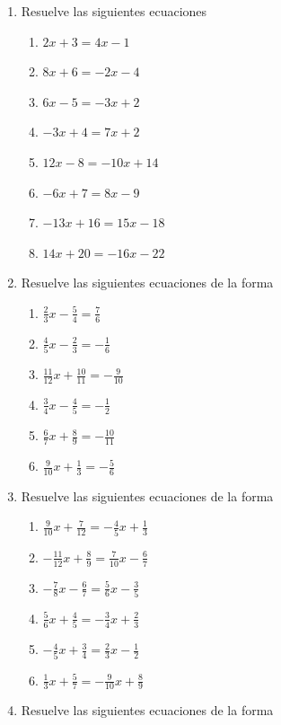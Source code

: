 \documentclass[12pt]{article}
\begin{document}
\begin{enumerate}
\def\labelenumi{\arabic{enumi}.}
\item
  Resuelve las siguientes ecuaciones

  \begin{enumerate}
  \def\labelenumii{\roman{enumii}.}
  \item
    \(2x + 3 = 4x - 1\)
  \item
    \(8x + 6 = -2x - 4\)
  \item
    \(6x - 5 = -3x + 2\)
  \item
    \(-3x + 4 = 7x + 2\)
  \item
    \(12x - 8 = -10x + 14\)
  \item
    \(-6x + 7 = 8x - 9\)
  \item
    \(-13x + 16 = 15x - 18\)
  \item
    \(14x + 20 = -16x - 22\)
  \end{enumerate}
\item
  Resuelve las siguientes ecuaciones de la forma

  \begin{enumerate}
  \def\labelenumii{\roman{enumii}.}
  \item
    \(\frac{2}{3}x - \frac{5}{4} = \frac{7}{6}\)
  \item
    \(\frac{4}{5}x - \frac{2}{3} = -\frac{1}{6}\)
  \item
    \(\frac{11}{12}x + \frac{10}{11} = -\frac{9}{10}\)
  \item
    \(\frac{3}{4}x - \frac{4}{5} = -\frac{1}{2}\)
  \item
    \(\frac{6}{7}x + \frac{8}{9} = -\frac{10}{11}\)
  \item
    \(\frac{9}{10}x + \frac{1}{3} = -\frac{5}{6}\)
  \end{enumerate}
\item
  Resuelve las siguientes ecuaciones de la forma

  \begin{enumerate}
  \def\labelenumii{\roman{enumii}.}
  \setcounter{enumii}{2}
  \item
    \(\frac{9}{10}x + \frac{7}{12} = -\frac{4}{5}x + \frac{1}{3}\)
  \item
    \(-\frac{11}{12}x + \frac{8}{9} = \frac{7}{10}x - \frac{6}{7}\)
  \item
    \(-\frac{7}{8}x - \frac{6}{7} = \frac{5}{6}x - \frac{3}{5}\)
  \item
    \(\frac{5}{6}x + \frac{4}{5} = -\frac{3}{4}x + \frac{2}{3}\)
  \item
    \(-\frac{4}{5}x + \frac{3}{4} = \frac{2}{3}x - \frac{1}{2}\)
  \item
    \(\frac{1}{3}x + \frac{5}{7} = -\frac{9}{10}x + \frac{8}{9}\)
  \end{enumerate}
\item
  Resuelve las siguientes ecuaciones de la forma


\end{enumerate}
\end{document}
